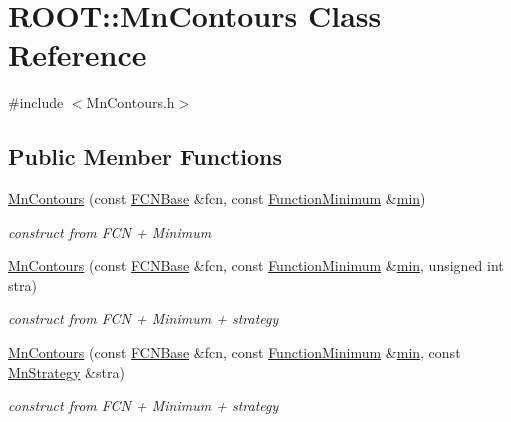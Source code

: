 \hypertarget{classROOT_1_1Minuit2_1_1MnContours}{}\section{R\+O\+OT\+:\+:Mn\+Contours Class Reference}
\label{classROOT_1_1Minuit2_1_1MnContours}


{\ttfamily \#include $<$Mn\+Contours.\+h$>$}

\subsection*{Public Member Functions}
\begin{DoxyCompactItemize}
\item 
\mbox{\hyperlink{classROOT_1_1Minuit2_1_1MnContours_a87d983509ac3ce6f6635407a81e07153}{Mn\+Contours}} (const \mbox{\hyperlink{classROOT_1_1Minuit2_1_1FCNBase}{F\+C\+N\+Base}} \&fcn, const \mbox{\hyperlink{classROOT_1_1Minuit2_1_1FunctionMinimum}{Function\+Minimum}} \&\mbox{\hyperlink{adat__devel_2lib_2SU3_2SU3__internal_8h_ab0f5fed3171eb00d1c5f037d9f518a23}{min}})
\begin{DoxyCompactList}\small\item\em construct from F\+CN + Minimum \end{DoxyCompactList}\item 
\mbox{\hyperlink{classROOT_1_1Minuit2_1_1MnContours_af56ce1293967140b9ee0ea0b30fad690}{Mn\+Contours}} (const \mbox{\hyperlink{classROOT_1_1Minuit2_1_1FCNBase}{F\+C\+N\+Base}} \&fcn, const \mbox{\hyperlink{classROOT_1_1Minuit2_1_1FunctionMinimum}{Function\+Minimum}} \&\mbox{\hyperlink{adat__devel_2lib_2SU3_2SU3__internal_8h_ab0f5fed3171eb00d1c5f037d9f518a23}{min}}, unsigned int stra)
\begin{DoxyCompactList}\small\item\em construct from F\+CN + Minimum + strategy \end{DoxyCompactList}\item 
\mbox{\hyperlink{classROOT_1_1Minuit2_1_1MnContours_a8f75794bb66e605caabac79cf7a32c77}{Mn\+Contours}} (const \mbox{\hyperlink{classROOT_1_1Minuit2_1_1FCNBase}{F\+C\+N\+Base}} \&fcn, const \mbox{\hyperlink{classROOT_1_1Minuit2_1_1FunctionMinimum}{Function\+Minimum}} \&\mbox{\hyperlink{adat__devel_2lib_2SU3_2SU3__internal_8h_ab0f5fed3171eb00d1c5f037d9f518a23}{min}}, const \mbox{\hyperlink{classROOT_1_1Minuit2_1_1MnStrategy}{Mn\+Strategy}} \&stra)
\begin{DoxyCompactList}\small\item\em construct from F\+CN + Minimum + strategy \end{DoxyCompactList}\item 

\end{DoxyCompactItemize}
